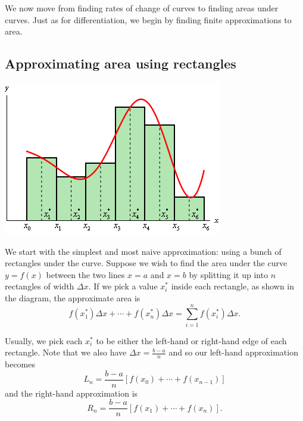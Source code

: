 


We now move from finding rates of change of curves to finding areas under curves. Just as
for differentiation, we begin by finding finite approximations to area.

\subsection*{Approximating area using rectangles}
\begin{center}
  \includegraphics[width=0.4\linewidth]{approx-rectangles}
\end{center}
We start with the simplest and most naive approximation: using a bunch of rectangles under the curve. Suppose
we wish to find the area under the curve $ y = f(x) $ between the two lines $ x = a $ and $ x = b $ by splitting
it up into $ n $ rectangles of width $ \Delta x $. If we pick a value $ x_i^\ast $ inside each rectangle, as shown
in the diagram, the approximate area is
\begin{displaymath}
  f(x_1^\ast) \Delta x + \cdots + f(x_n^\ast) \Delta x = \sum_{i = 1}^n f(x_i^\ast) \Delta x.
\end{displaymath}

Usually, we pick each $ x_i^\ast $ to be either the left-hand or right-hand edge of each rectangle. Note that
we also have $ \Delta x = \frac{b - a}{n} $ and so our left-hand approximation becomes
\begin{displaymath}
  L_n = \frac{b - a}{n} \left[ f(x_0) + \cdots + f(x_{n - 1}) \right]
\end{displaymath}
and the right-hand approximation is
\begin{displaymath}
  R_n = \frac{b - a}{n} \left[ f(x_1) + \cdots + f(x_{n}) \right].
\end{displaymath}

